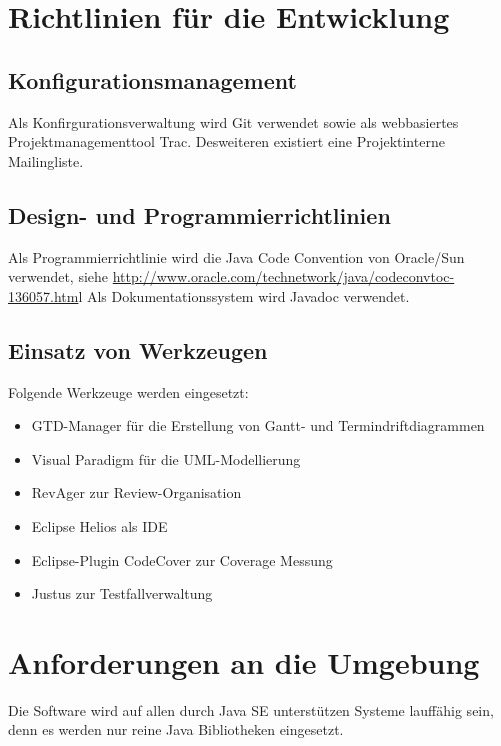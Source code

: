 \documentclass[a4paper,10pt]{scrartcl}
\begin{document}
\section{Richtlinien für die Entwicklung}
\subsection{Konfigurationsmanagement}
Als Konfirgurationsverwaltung wird Git verwendet sowie als webbasiertes Projektmanagementtool Trac. Desweiteren existiert eine Projektinterne Mailingliste.
\subsection{Design- und Programmierrichtlinien}
Als Programmierrichtlinie wird die Java Code Convention von Oracle/Sun verwendet, siehe \url{http://www.oracle.com/technetwork/java/codeconvtoc-136057.htm}l
Als Dokumentationssystem wird Javadoc verwendet.
\subsection{Einsatz von Werkzeugen}
Folgende Werkzeuge werden eingesetzt:
\begin{itemize}
\item GTD-Manager für die Erstellung von Gantt- und Termindriftdiagrammen
\item Visual Paradigm für die UML-Modellierung
\item RevAger zur Review-Organisation
\item Eclipse Helios als IDE
\item Eclipse-Plugin CodeCover zur Coverage Messung
\item Justus zur Testfallverwaltung
\end{itemize}
\section{Anforderungen an die Umgebung}
Die Software wird auf allen durch Java SE unterstützen Systeme lauffähig sein, denn es werden nur reine Java Bibliotheken eingesetzt.
\end{document}
